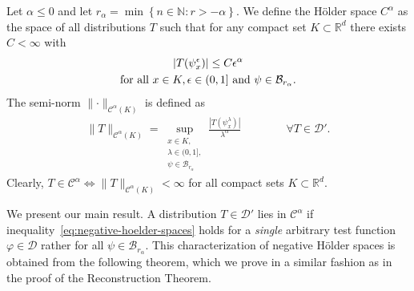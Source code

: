 \begin{definition}
  Let \( \alpha \leq 0 \) and let \( r_\alpha = \min\left\{ n \in \mathbb{N} : r > -\alpha \right\} \). We define the Hölder space \( C^\alpha \) as the space of all distributions \( T \) such that for any compact set \( K \subset \mathbb{R}^d \) there exists \( C < \infty \) with 
  \begin{gather}
    |T(\psi^\epsilon_x)| \leq C \epsilon^\alpha \label{eq:negative-hoelder-spaces} \\
    \text{for all \(x \in K,  \epsilon \in (0,1] \) and \( \psi \in \mathcal{B}_{r_\alpha} \)}. \nonumber 
  \end{gather}
  The semi-norm \( \lVert \cdot \rVert_{\mathcal{C}^\alpha(K)} \) is defined as 
  \begin{align}\label{tennisarm}
    \lVert T \rVert_{\mathcal{C}^\alpha(K)} 
    = \sup_{
      \substack{
        x \in K,\\
        \lambda \in (0,1],\\
        \psi \in \mathcal{B}_{r_\alpha}
      }
    } \frac{|T(\psi^\lambda_x)|}{\lambda^\alpha} \hspace{4em} \forall T \in \mathcal{D}'.
  \end{align}
  Clearly, \( T \in \mathcal{C}^\alpha \iff \lVert T \rVert_{\mathcal{C}^\alpha(K)} < \infty \) for all compact sets \( K \subset \mathbb{R}^d \).
\end{definition}

We present our main result. A distribution \( T \in \mathcal{D}' \) lies in \( \mathcal{C}^\alpha \) if inequality~\eqref{eq:negative-hoelder-spaces} holds for a \emph{single} arbitrary test function \( \varphi \in \mathcal{D} \) rather for all \( \psi \in \mathcal{B}_{r_\alpha} \). This characterization of negative Hölder spaces is obtained from the following theorem, which we prove in a similar fashion as in the proof of the Reconstruction Theorem.

